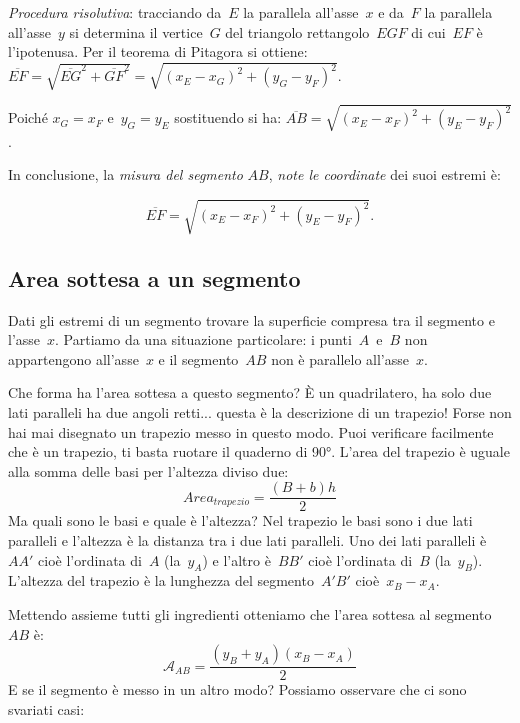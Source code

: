 \emph{Procedura risolutiva}: tracciando da~\(E\) la parallela all'asse~\(x\) 
e da~\(F\) la parallela all'asse~\(y\) si determina il vertice~\(G\) del 
triangolo 
rettangolo~\(EGF\) di cui~\(EF\) è l'ipotenusa.
Per il teorema di Pitagora si 
ottiene:~\(\overline{EF}=\sqrt{\overline{EG}^2 + \overline{GF}^2}=
\sqrt{\left(x_E-x_G \right)^2+\left(y_G-y_F \right)^2}\). %

Poiché \(x_{G}=x_{F}\) e~\(y_{G}=y_{E}\) sostituendo si ha:
\(\overline{AB}=\sqrt{\left(x_{E}-x_{F}\right)^{2}+\left(y_{E}-y_{F}\right)^{2}}
\).

In conclusione, la \emph{misura del segmento} \(AB\), \emph{note le coordinate} 
dei suoi estremi è:

\[\overline{EF}=\sqrt{\left(x_{E}-x_{F}\right)^{2}+\left(y_{E}-y_{F}\right)^{2}}
.\]


\subsection{Area sottesa a un segmento}

Dati gli estremi di un segmento trovare la superficie compresa tra il 
segmento e l'asse~\(x\). Partiamo da una situazione particolare:
i punti~\(A\)~e~\(B\) non appartengono all'asse~\(x\) e il segmento~\(AB\) non 
è parallelo all'asse~\(x\).


\begin{center} \areasottesauno \end{center}

Che forma ha l'area sottesa a questo segmento? È un quadrilatero, ha solo due 
lati paralleli ha due angoli retti... questa è la descrizione di un trapezio!
Forse non hai mai disegnato un trapezio messo in questo modo. Puoi verificare 
facilmente che è un trapezio, ti basta ruotare il quaderno di 90°. 
L'area del trapezio è uguale alla somma delle basi per l'altezza diviso due:
\[Area_{trapezio}= \frac{(B+b)h}{2}\]
Ma quali sono le basi e quale è l'altezza? Nel trapezio le basi sono i due 
lati paralleli e l'altezza è la distanza tra i due lati paralleli.
Uno dei lati paralleli è~\(AA'\) cioè l'ordinata di~\(A\) (la~\(y_A\)) 
e l'altro è~\(BB'\) cioè l'ordinata di~\(B\) (la~\(y_B\)).
L'altezza del trapezio è la lunghezza del segmento~\(A'B'\) 
cioè~\(x_B - x_A\).

Mettendo assieme tutti gli ingredienti otteniamo che l'area sottesa al 
segmento~\(AB\) è:
\[\mathcal{A}_{AB} = \frac{(y_B + y_A) (x_B - x_A)}{2}\]
E se il segmento è messo in un altro modo?
Possiamo osservare che ci sono svariati casi:


